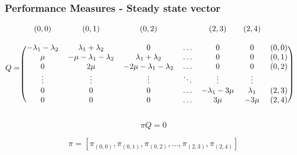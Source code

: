 \begin{frame}
    \frametitle{Performance Measures - Steady state vector}
    
    \tiny
    \begin{equation*}
        Q = 
        \begin{blockarray}{cccccccc}
            (0, 0) & (0, 1) & (0, 2) & & (2, 3) & (2, 4) & \\
            & & & & & & & \\
            \begin{block}{(ccccccc)c}
                -\lambda_1 - \lambda_2 & \lambda_1 + \lambda_2 & 0 & \dots & 0 & 0 & (0,0) \\
                \mu & -\mu - \lambda_1 - \lambda_2 & \lambda_1 + \lambda_2 & \dots & 0 & 0 & (0,1) \\
                0 & 2\mu & -2\mu - \lambda_1 - \lambda_2 & \dots & 0 & 0 & (0,2) \\
                \vdots & \vdots & \vdots & \ddots & \vdots & \vdots \\
                0 & 0 & 0 & \dots & -\lambda_1 - 3\mu & \lambda_1 & (2,3) \\
                0 & 0 & 0 & \dots & 3\mu & -3\mu & (2,4) \\
            \end{block}
        \end{blockarray}    
    \end{equation*}

    \normalsize
    \begin{equation*}
        \pi Q = 0
    \end{equation*}

    \begin{equation*}
        \pi = \left[
            \pi_{(0,0)}, \pi_{(0,1)}, \pi_{(0,2)}, \dots, \pi_{(2,3)}, \pi_{(2,4)}
        \right]
    \end{equation*}

\end{frame}


